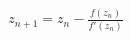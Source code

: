\documentclass[preview]{standalone}
\begin{document}
\begin{align*}
z_{n+1} = z_n - \frac{f(z_n)}{f'(z_n)}
\end{align*}
\end{document}
